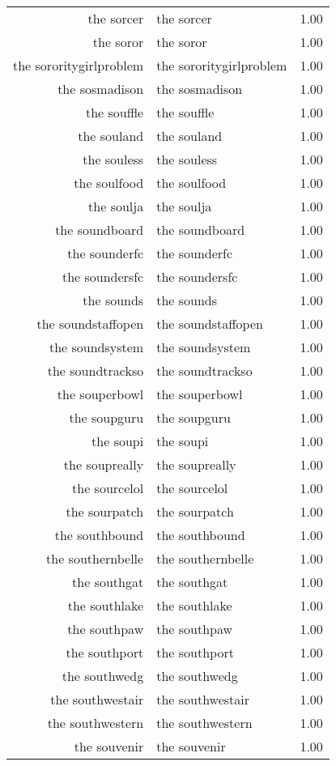 \begin{table}[ht]
\begin{tabular}{rlr}
  the sorcer & the sorcer & 1.00 \\ 
  the soror & the soror & 1.00 \\ 
  the sororitygirlproblem & the sororitygirlproblem & 1.00 \\ 
  the sosmadison & the sosmadison & 1.00 \\ 
  the souffle & the souffle & 1.00 \\ 
  the souland & the souland & 1.00 \\ 
  the souless & the souless & 1.00 \\ 
  the soulfood & the soulfood & 1.00 \\ 
  the soulja & the soulja & 1.00 \\ 
  the soundboard & the soundboard & 1.00 \\ 
  the sounderfc & the sounderfc & 1.00 \\ 
  the soundersfc & the soundersfc & 1.00 \\ 
  the sounds & the sounds & 1.00 \\ 
  the soundstaffopen & the soundstaffopen & 1.00 \\ 
  the soundsystem & the soundsystem & 1.00 \\ 
  the soundtrackso & the soundtrackso & 1.00 \\ 
  the souperbowl & the souperbowl & 1.00 \\ 
  the soupguru & the soupguru & 1.00 \\ 
  the soupi & the soupi & 1.00 \\ 
  the soupreally & the soupreally & 1.00 \\ 
  the sourcelol & the sourcelol & 1.00 \\ 
  the sourpatch & the sourpatch & 1.00 \\ 
  the southbound & the southbound & 1.00 \\ 
  the southernbelle & the southernbelle & 1.00 \\ 
  the southgat & the southgat & 1.00 \\ 
  the southlake & the southlake & 1.00 \\ 
  the southpaw & the southpaw & 1.00 \\ 
  the southport & the southport & 1.00 \\ 
  the southwedg & the southwedg & 1.00 \\ 
  the southwestair & the southwestair & 1.00 \\ 
  the southwestern & the southwestern & 1.00 \\ 
  the souvenir & the souvenir & 1.00 \\ 

\end{tabular}
\end{table}
